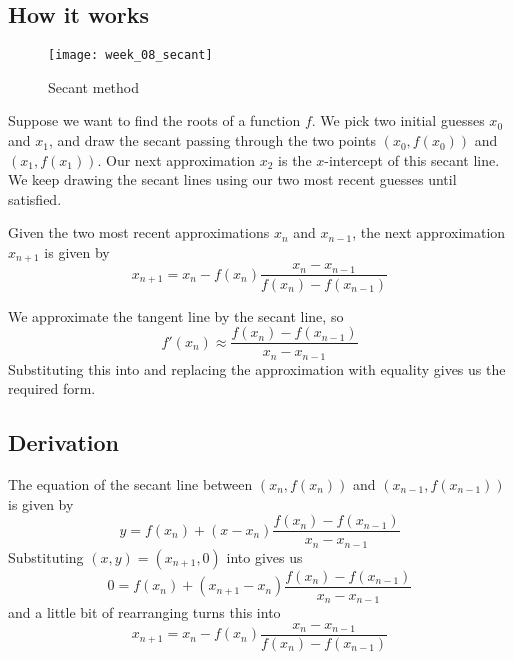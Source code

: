 
\subsection{How it works}
\begin{figure}[!htbp]
  \centering
  \texttt{[image: week\_08\_secant]}
  \caption{Secant method}
\end{figure}
Suppose we want to find the roots of a function $f$. We pick two initial guesses $x_0$ and $x_1$, and draw the secant passing through the two points $(x_0, f(x_0))$ and $(x_1, f(x_1))$. Our next approximation $x_2$ is the $x$-intercept of this secant line. We keep drawing the secant lines using our two most recent guesses until satisfied.
\begin{definition}
  Given the two most recent approximations $x_n$ and $x_{n - 1}$, the next approximation $x_{n + 1}$ is given by
  \[
    x_{n + 1} = x_n - f(x_n) \frac{x_n - x_{n - 1}}{f(x_n) - f(x_{n - 1})}
  \]
\end{definition}
\begin{intuition}
  We approximate the tangent line by the secant line, so
  \[
    f'(x_n) \approx \frac{f(x_n) - f(x_{n - 1})}{x_n - x_{n - 1}}
  \]
  Substituting this into  and replacing the approximation with equality gives us the required form.
\end{intuition}


\subsection{Derivation}
The equation of the secant line between $(x_n, f(x_n))$ and $(x_{n - 1}, f(x_{n - 1}))$ is given by
\begin{equation}
  y = f(x_n) + (x - x_n) \frac{f(x_n) - f(x_{n - 1})}{x_n - x_{n - 1}}
  \label{eqn:secant}
\end{equation}
Substituting $(x, y) = (x_{n + 1}, 0)$ into  gives us
\[
  0 = f(x_n) + (x_{n + 1} - x_n) \frac{f(x_n) - f(x_{n - 1})}{x_n - x_{n - 1}}
\]
and a little bit of rearranging turns this into
\[
  x_{n + 1} = x_n - f(x_n) \frac{x_n - x_{n - 1}}{f(x_n) - f(x_{n - 1})}
\]



